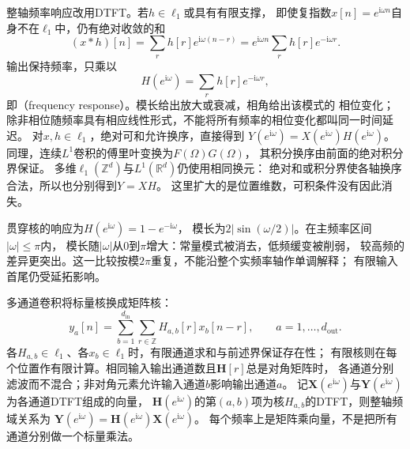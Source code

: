 整轴频率响应改用DTFT。若$h\in\ell_1$或具有有限支撑，
即使复指数$x[n]=e^{\mathrm i\omega n}$自身不在$\ell_1$中，仍有绝对收敛的和
\[
  (x*h)[n]=\sum_r h[r]e^{\mathrm i\omega(n-r)}
  =e^{\mathrm i\omega n}\sum_r h[r]e^{-\mathrm i\omega r}.
\]
输出保持频率，只乘以
\begin{equation}
  H(e^{\mathrm i\omega})=\sum_r h[r]e^{-\mathrm i\omega r},
  \label{eq:signal-analysis-filter-frequency-response}
\end{equation}
即（frequency response）。模长给出放大或衰减，相角给出该模式的
相位变化；除非相位随频率具有相应线性形式，不能将所有频率的相位变化都叫同一时间延迟。
对$x,h\in\ell_1$，绝对可和允许换序，直接得到
$Y(e^{\mathrm i\omega})=X(e^{\mathrm i\omega})H(e^{\mathrm i\omega})$。
同理，连续$L^1$卷积的傅里叶变换为$F(\Omega)G(\Omega)$，
其积分换序由前面的绝对积分界保证。
多维$\ell_1(\mathbb Z^d)$与$L^1(\mathbb R^d)$仍使用相同换元：
绝对和或积分界使各轴换序合法，所以也分别得到$Y=XH$。
这里扩大的是位置维数，可积条件没有因此消失。

贯穿核的响应为$H(e^{\mathrm i\omega})=1-e^{-\mathrm i\omega}$，
模长为$2|\sin(\omega/2)|$。在主频率区间$|\omega|\leq\pi$内，
模长随$|\omega|$从$0$到$\pi$增大：常量模式被消去，低频缓变被削弱，
较高频的差异更突出。这一比较按模$2\pi$重复，不能沿整个实频率轴作单调解释；
有限输入首尾仍受延拓影响。

多通道卷积将标量核换成矩阵核：
\begin{equation}
  y_a[n]=\sum_{b=1}^{d_{\mathrm{in}}}\sum_{r\in\mathbb Z}
  H_{a,b}[r]x_b[n-r],
  \qquad a=1,\ldots,d_{\mathrm{out}}.
  \label{eq:signal-multichannel-convolution}
\end{equation}
各$H_{a,b}\in\ell_1$、各$x_b\in\ell_1$时，有限通道求和与前述界保证存在性；
有限核则在每个位置作有限计算。相同输入输出通道数且$\bm H[r]$总是对角矩阵时，
各通道分别滤波而不混合；非对角元素允许输入通道$b$影响输出通道$a$。
记$\bm X(e^{\mathrm i\omega})$与$\bm Y(e^{\mathrm i\omega})$为各通道DTFT组成的向量，
$\bm H(e^{\mathrm i\omega})$的第$(a,b)$项为核$H_{a,b}$的DTFT，则整轴频域关系为
$\bm Y(e^{\mathrm i\omega})=\bm H(e^{\mathrm i\omega})\bm X(e^{\mathrm i\omega})$。
每个频率上是矩阵乘向量，不是把所有通道分别做一个标量乘法。

